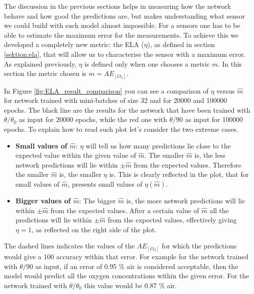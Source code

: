 \documentclass[9pt,twocolumn,twoside,pdftex]{optica}
\begin{document}
The discussion in the previous sections helps in measuring how the network behave and how good the predictions are, but makes understanding what sensor we could build with such model almost impossible. For a sensors one has to be able to estimate the maximum error for the measurements. To achieve this we developed a completely new metric: the ELA ($\eta$), as defined in section \ref{sektion:ela}, that will allow us to characterise the sensor with a maximum error. As explained previously, $\eta$ is defined only when one chooses a metric $m$. In this section the metric chosen is $m=AE_{[O_2]}$.  

In Figure \ref{fig:ELA_result_comparison} you can see a comparison of $\eta$ versus $\hat m$ for network trained with mini-batches of size 32 and for 20000 and 100000 epochs. The black line are the results for the network that have been trained with $\theta/\theta_0$ as input for 20000 epochs, while the red one with $\theta/90$ as input for 100000 epochs.  
To explain how to read such plot let's consider the two extreme cases. 
\begin{itemize}
\item {\bf Small values of $\hat m$}: $\eta$ will tell us how many predictions lie close to the expected value within the given value of $\hat m$. The smaller $\hat m$ is, the less network predictions will lie within $\pm \hat m$ from the expected values. Therefore the smaller $\hat m$ is, the smaller $\eta$ is. This is clearly reflected in the plot, that for small values of $\hat m$, presents small values of $\eta(\hat m)$.
\item {\bf Bigger values of $\hat m$}: The bigger $\hat m$ is, the more network predictions will lie within $\pm \hat m$ from the expected values. After a certain value of $\hat m$ all the predictions will lie within $\pm \hat m$ from the expected values, effectively giving $\eta = 1$, as reflected on the right side of the plot. 
\end{itemize}

The dashed lines indicates the values of the $AE_{[O_2]}$ for which the predictions would give a 100 accuracy within that error. For example for the network trained with $\theta/90$ as input, if an error of 0.95 \% air is considered acceptable, then the model would predict all the oxygen concentrations within the given error. For the network trained with $\theta/\theta_0$ this value would be 0.87 \% air. 
\end{document}
